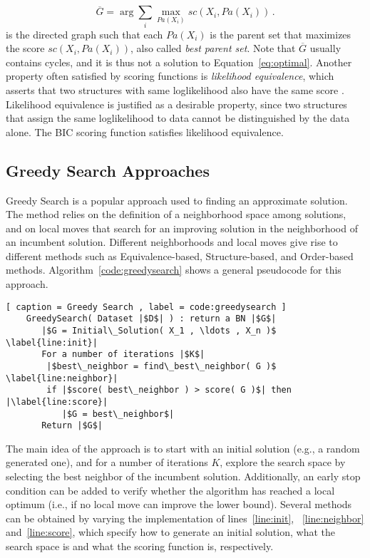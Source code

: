 	\begin{equation}
		\label{eq:bestparents}
		\overline{G} = \arg \sum_i \max_{{Pa}(X_i)} sc( X_i, {Pa}( X_i ) ) \, . 
	\end{equation}
is the directed graph such that each ${Pa}( X_i )$ is the parent set that maximizes the score ${sc}( X_i , {Pa}( X_i ) )$, also called \emph{best parent set}. Note that $\overline G$ usually contains cycles, and it is thus not a solution to Equation~\ref{eq:optimal}.
Another property often satisfied by scoring functions is \emph{likelihood equivalence}, which asserts that two structures with same loglikelihood also have the same score \cite{Maxwell04}. Likelihood equivalence is justified as a desirable property, since two structures that assign the same loglikelihood to data cannot be distinguished by the data alone. The BIC scoring function satisfies likelihood equivalence.

\subsection{Greedy Search Approaches}
\label{subsec:greedysearch}

Greedy Search is a popular approach used to finding an approximate solution. The method relies on the definition of a neighborhood space among solutions, and on local moves that search for an improving solution in the neighborhood of an incumbent solution. Different neighborhoods and local moves give rise to different methods such as Equivalence-based, Structure-based,  and Order-based methods. Algorithm~\ref{code:greedysearch} shows a general pseudocode for this approach.

\begin{lstlisting}[ caption = Greedy Search , label = code:greedysearch ]
	GreedySearch( Dataset |$D$| ) : return a BN |$G$|
	   |$G = Initial\_Solution( X_1 , \ldots , X_n )$ \label{line:init}|
	   For a number of iterations |$K$|
		|$best\_neighbor = find\_best\_neighbor( G )$ \label{line:neighbor}|
		if |$score( best\_neighbor ) > score( G )$| then |\label{line:score}|
		   |$G = best\_neighbor$|
	   Return |$G$|
\end{lstlisting}
The main idea of the approach is to start with an initial solution (e.g., a random generated one), and for a number of iterations $K$, explore the search space by selecting the best neighbor of the incumbent solution. Additionally, an early stop condition can be added to verify whether the algorithm has reached a local optimum (i.e., if no local move can improve the lower bound).
Several methods can be obtained by varying the implementation of lines~\ref{line:init}, ~\ref{line:neighbor} and~\ref{line:score}, which specify how to generate an initial solution, what the search space is and what the scoring function is, respectively.

